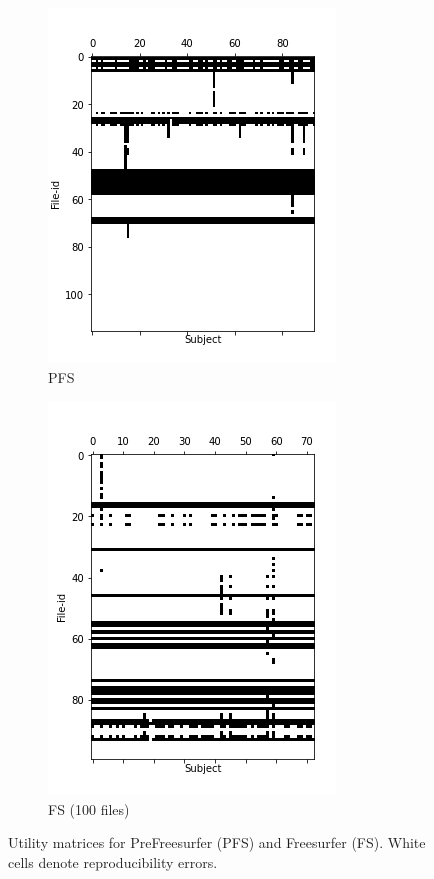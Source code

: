 \documentclass[10pt, conference, compsocconf]{IEEEtran}
\begin{document}
\begin{figure}[h!]
  \centering
  \begin{subfigure}[b]{0.45\columnwidth}
        \includegraphics[width=0.8\columnwidth]{data/Utility_Matrix/PreFreeSurfer/PFS_6v7_utility_matrix.png}
  \caption{PFS}
  \end{subfigure}
  \begin{subfigure}[b]{0.45\columnwidth}
        \includegraphics[width=0.8\columnwidth]{data/Utility_Matrix/FS-100files/FS-First-bound-100files.png}
  \caption{FS (100 files)}
  \end{subfigure}
  \caption{Utility matrices for PreFreesurfer (PFS) and Freesurfer (FS). White cells denote reproducibility errors.}
    \label{fig:utility-matrices}
\end{figure}
\end{document}
